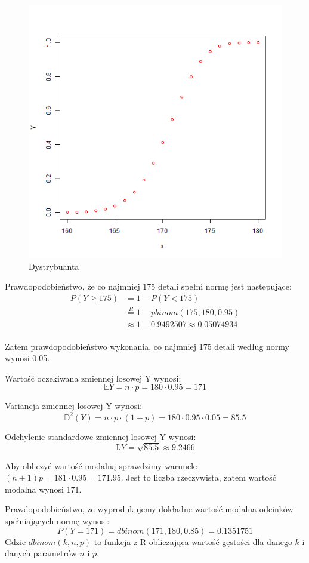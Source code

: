 \documentclass{article}
\begin{document}
{\begin{figure}[h!]
\begin{center}
\includegraphics[height=0.35\textheight, angle=0]{"lab4zad1_f.png"}
\caption{Dystrybuanta}
\end{center}
\end{figure}

\newpage
Prawdopodobieństwo, że co najmniej 175 detali spełni normę jest następujące:
\begin{align*}
	P(Y\geq175) & = 1 - P(Y<175) \\
	& \overset{R}{=} 1 - pbinom(175,180,0.95) \\
	& \approx 1 - 0.9492507 \approx 0.05074934
\end{align*} \\
Zatem prawdopodobieństwo wykonania, co najmniej 175 detali według normy wynosi 0.05.
\par
Wartość oczekiwana zmiennej losowej Y wynosi:
$$\mathbb{E}Y = n\cdot p = 180\cdot0.95 = 171$$
\par
Variancja zmiennej losowej Y wynosi:
$$\mathbb{D}^2(Y) = n\cdot p\cdot(1-p) = 180\cdot 0.95\cdot0.05 = 85.5$$
\par
Odchylenie standardowe zmiennej losowej Y wynosi:
$$\mathbb{D}Y = \sqrt{85.5} \approx 9.2466$$
\par
Aby obliczyć wartość modalną sprawdzimy warunek: $(n+1)p = 181\cdot 0.95 = 171.95$. 
Jest to liczba rzeczywista, zatem wartość modalna wynosi 171.
\par
Prawdopodobieństwo, że wyprodukujemy dokładne wartość modalna odcinków spełniających normę wynosi:
$$P(Y=171) = dbinom(171,180,0.85) = 0.1351751$$
Gdzie $dbinom(k,n,p)$ to funkcja z R obliczająca wartość gęstości dla danego $k$ i danych parametrów $n$ i $p$.

}
\end{document}

